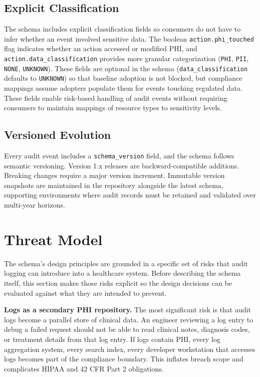 \documentclass[11pt,a4paper]{article}
\begin{document}
\subsection{Explicit Classification}

The schema includes explicit classification fields so consumers do not have to infer whether an event involved sensitive data. The boolean \texttt{action.phi\_touched} flag indicates whether an action accessed or modified PHI, and \texttt{action.data\_classification} provides more granular categorization (\texttt{PHI}, \texttt{PII}, \texttt{NONE}, \texttt{UNKNOWN}). These fields are optional in the schema (\texttt{data\_classification} defaults to \texttt{UNKNOWN}) so that baseline adoption is not blocked, but compliance mappings assume adopters populate them for events touching regulated data. These fields enable risk-based handling of audit events without requiring consumers to maintain mappings of resource types to sensitivity levels.

\subsection{Versioned Evolution}

Every audit event includes a \texttt{schema\_version} field, and the schema follows semantic versioning. Version 1.x releases are backward-compatible additions. Breaking changes require a major version increment. Immutable version snapshots are maintained in the repository alongside the latest schema, supporting environments where audit records must be retained and validated over multi-year horizons.

\section{Threat Model}

The schema's design principles are grounded in a specific set of risks that audit logging can introduce into a healthcare system. Before describing the schema itself, this section makes those risks explicit so the design decisions can be evaluated against what they are intended to prevent.

\textbf{Logs as a secondary PHI repository.} The most significant risk is that audit logs become a parallel store of clinical data. An engineer reviewing a log entry to debug a failed request should not be able to read clinical notes, diagnosis codes, or treatment details from that log entry. If logs contain PHI, every log aggregation system, every search index, every developer workstation that accesses logs becomes part of the compliance boundary. This inflates breach scope and complicates HIPAA and 42 CFR Part 2 obligations.
\end{document}
